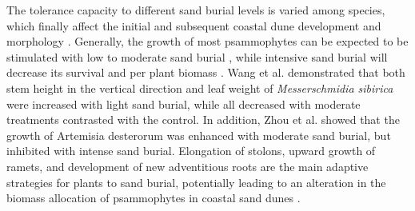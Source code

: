 \documentclass[]{interact}
\theoremstyle{plain}%
\theoremstyle{definition}
\theoremstyle{remark}
\begin{document}
\label{Introduction-3}
The tolerance capacity to different sand burial levels is varied among species, which finally affect the initial and subsequent coastal dune development and morphology 
\citep{hespReviewBiologicalGeomorphological1989}. 
Generally, the growth of most psammophytes can be expected to be stimulated with low to moderate sand burial \citep{ruilinAnalysisGrowthStrategy2015,harrisDifferentialResponseBarrier2017,brownMechanismsSurvivingBurial2018,wangEffectsSandBurial2019}, while intensive sand burial will decrease its survival and per plant biomass \citep{maunEffectsBurialSand1996,franksBurialDisturbanceLeads2003}. Wang et al. \citet{wangAdvancesStudiesMorphological2005} demonstrated that both stem height in the vertical direction and leaf weight of \textit{Messerschmidia sibirica} were increased with light sand burial, while all decreased with moderate treatments contrasted with the control. In addition, Zhou et al. \citet{ruilinPhysiologicalAdaptationMechanisms2015} showed that the growth of Artemisia desterorum was enhanced with moderate sand burial, but inhibited with intense sand burial. Elongation of stolons, upward growth of ramets, and development of new adventitious roots are the main adaptive strategies for plants to sand burial, potentially leading to an alteration in the biomass allocation of psammophytes in coastal sand dunes \citep{dechAdventitiousRootProduction2006,frosiniGlobalChangeResponse2012,mendoza-gonzalezBiologicalFloraCoastal2014,brownMechanismsSurvivingBurial2018}.
\end{document}
